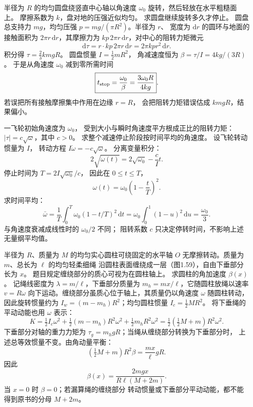 半径为 $R$ 的均匀圆盘绕竖直中心轴以角速度
$\omega_0$ 旋转，然后轻放在水平粗糙面上。
摩擦系数为 $k$，盘对地的压强近似均匀。
求圆盘继续旋转多久才停止。
\exsolution
圆盘总支持力 $mg$，均匀压强
$p=mg/(\pi R^2)$。半径为 $r$、
宽度为 $\mathrm dr$ 的圆环与地面的接触面积为
$2\pi r\,\mathrm dr$，其摩擦力为
$k p\,2\pi r\,\mathrm dr$，对中心的阻转力矩微元
\[
\mathrm d\tau=r\cdot k p\,2\pi r\,\mathrm dr
=2\pi kp r^2\,\mathrm dr.
\]
积分得 $\tau=\frac23kmgR$。
圆盘惯量 $I=\frac12mR^2$，
角减速度恒为
$\beta=\tau/I=4kg/(3R)$。
于是从角速度 $\omega_0$ 减到零所需时间
\[
\boxed{t_{\rm stop}=\frac{\omega_0}{\beta}
=\frac{3\omega_0R}{4kg}}.
\]
\excheck 若误把所有接触摩擦集中作用在边缘 $r=R$，
会把阻转力矩错误估成 $kmgR$，结果偏小。

一飞轮初始角速度为 $\omega_0$，
受到大小与瞬时角速度平方根成正比的阻转力矩：
$|\tau|=c\sqrt{\omega}$，其中 $c>0$。
求整个减速停止阶段按时间平均的角速度。
\exsolution
设飞轮转动惯量为 $I$，
转动方程
$I\dot\omega=-c\sqrt{\omega}$。
分离变量积分：
\[
2\sqrt{\omega(t)}=
2\sqrt{\omega_0}-\frac cI t.
\]
停止时间为 $T=2I\sqrt{\omega_0}/c$，
因此在 $0\le t\le T$，
\[
\omega(t)=\omega_0\left(1-\frac tT\right)^2.
\]
求时间平均：
\[
\boxed{\bar\omega=\frac1T\int_0^T
\omega_0(1-t/T)^2\,\mathrm dt
=\omega_0\int_0^1(1-u)^2\,\mathrm du
=\frac{\omega_0}{3}}.
\]
\excheck 与角速度衰减成线性时的 $\omega_0/2$ 不同；
阻转系数 $c$ 只决定停转时间，不影响上述无量纲平均值。


半径为 $R$、质量为 $M$ 的均匀实心圆柱可绕固定的水平轴
$O$ 无摩擦转动。质量为 $m$、总长为 $\ell$ 的均匀轻柔细绳
沿圆柱表面缠绕成一层（图1.59），自由下垂部分长为 $x$。
题目规定缠绕部分的质心可视为在圆柱轴上。
求圆柱的角加速度 $\beta(x)$。
\exsolution
记绳线密度为 $\lambda=m/\ell$，下垂部分质量为
$m_h=mx/\ell$，它随圆柱放绳以速率 $v=R\omega$
向下运动。缠绕部分虽质心位于轴上，其质量仍以角速度
$\omega$ 随圆柱转动，因此旋转惯量约为
$I_w=(m-m_h)R^2$；均匀圆柱惯量
$I_c=\frac12MR^2$。
将下垂绳的平动动能也用 $\omega$ 表示：
\[
K=\tfrac12 I_c\omega^2+
\tfrac12(m-m_h)R^2\omega^2+
\tfrac12m_hR^2\omega^2
=\tfrac12(\tfrac12M+m)R^2\omega^2.
\]
下垂部分对轴的重力力矩为
$\tau_g=m_hgR$；当绳从缠绕部分转换为下垂部分时，
上述总等效惯量不变。由角动量平衡：
\[
(\tfrac12M+m)R^2\beta
=\frac{mx}{\ell}gR.
\]
因此
\[
\boxed{\beta(x)=\frac{2mgx}{R\ell(M+2m)}}.
\]
\excheck 当 $x=0$ 时 $\beta=0$；若漏算绳的缠绕部分
转动惯量或下垂部分平动动能，都不能得到原书的分母 $M+2m$。

